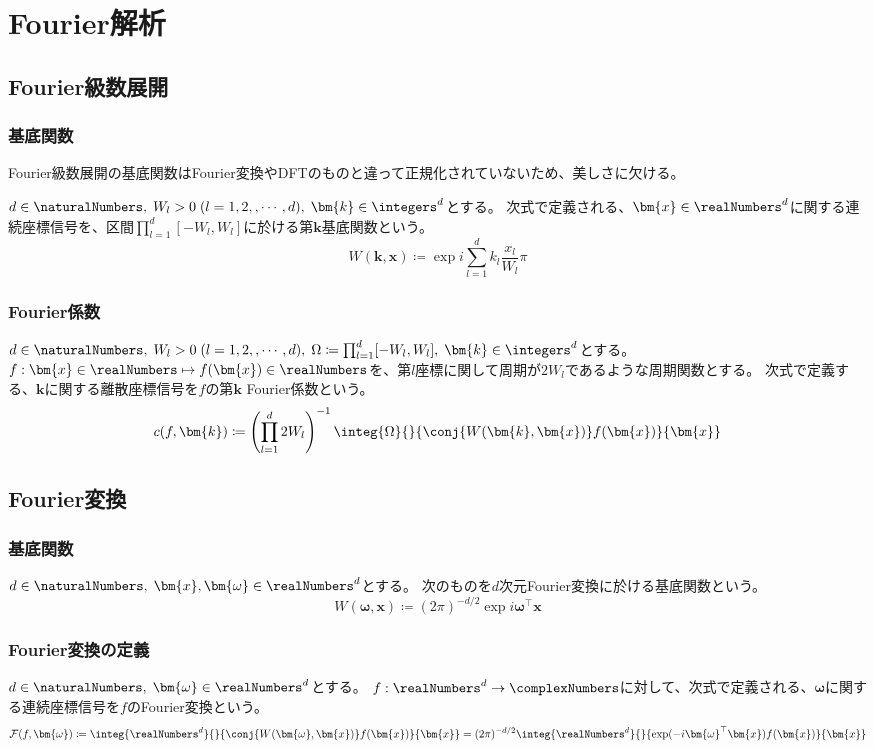 \part{Fourier解析}
		\chapter{Fourier級数展開}
			\section{基底関数}
				Fourier級数展開の基底関数はFourier変換やDFTのものと違って正規化されていないため、美しさに欠ける。
				\par
				$d\in\naturalNumbers,\;W_l>0\;(l=1,2,,\cdots,d),\;\bm{k}\in\integers^d$とする。
				次式で定義される、$\bm{x}\in\realNumbers^d$に関する連続座標信号を、区間$\prod_{l=1}^d [-W_l,W_l]$に於ける第$\bm{k}$基底関数という。
				\[ W(\bm{k},\bm{x}) \coloneqq \exp i\sum_{l=1}^d k_l\frac{x_l}{W_l}\pi \]

			\section{Fourier係数}
				$d\in\naturalNumbers,\;W_l>0\;(l=1,2,,\cdots,d),\;\Omega\coloneqq\prod_{l=1}^d [-W_l,W_l],\;\bm{k}\in\integers^d$とする。
				$f:\bm{x}\in\realNumbers \mapsto f(\bm{x})\in\realNumbers$を、第$l$座標に関して周期が$2W_l$であるような周期関数とする。
				次式で定義する、$\bm{k}$に関する離散座標信号を$f$の第$\bm{k}$ Fourier係数という。
				\[ c(f,\bm{k}) \coloneqq \left(\prod_{l=1}^d 2W_l\right)^{-1}\integ{\Omega}{}{\conj{W(\bm{k},\bm{x})}f(\bm{x})}{\bm{x}} \]

		\chapter{Fourier変換}
			\section{基底関数}
				$d\in\naturalNumbers,\;\bm{x},\bm{\omega}\in\realNumbers^d$とする。
				次のものを$d$次元Fourier変換に於ける基底関数という。
				\[ W(\bm{\omega},\bm{x}) \coloneqq (2\pi)^{-d/2}\exp i\bm{\omega}^\top\bm{x} \]

			\section{Fourier変換の定義}
				$d\in\naturalNumbers,\;\bm{\omega}\in\realNumbers^d$とする。
				$f:\realNumbers^d\to\complexNumbers$に対して、次式で定義される、$\bm{\omega}$に関する連続座標信号を$f$のFourier変換という。
				\[ \mathcal{F}(f,\bm{\omega}) \coloneqq \integ{\realNumbers^d}{}{\conj{W(\bm{\omega},\bm{x})}f(\bm{x})}{\bm{x}} = (2\pi)^{-d/2} \integ{\realNumbers^d}{}{\exp (-i\bm{\omega}^\top\bm{x})f(\bm{x})}{\bm{x}} \]


